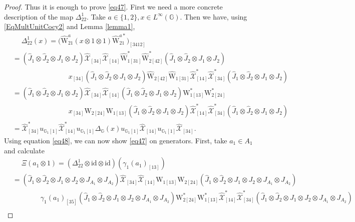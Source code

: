\documentclass[reqno]{amsart}
\numberwithin{equation}{section}
\newcommand{\id}{\mathrm{id}}
\newcommand{\G}{\mathbb{G}}
\newcommand{\mc}{\mathcal}
\newcommand{\wh}{\widehat}
\newcommand{\ww}{\mathrm{W}}
\begin{document}
\begin{proof}
Thus it is enough to prove \eqref{eq47}. First we need a more concrete description of the map $\Delta_{22}^1$. Take $a\in\{1,2\}, x\in L^{\infty}(\G)$. Then we have, using \eqref{EqMultUnitCocy2} and Lemma \ref{lemma1},
\begin{equation}\begin{split}\label{eq48}
&\quad\;
\Delta^1_{22}(x)=\bigl(
\hat{\ww}^a_{21} (x\otimes 1\otimes 1) \hat{\ww}^{a *}_{21}
 \bigr)_{[3412]}\\
 &=
 (\hat{J}_1\otimes \hat{J}_2\otimes J_1\otimes J_2)
 \wh{\mc{X}}_{[34]}\wh{\mc{X}}_{[14]}
\hat{\ww}^*_{1[31]}
\hat{\ww}^*_{2[42]}
(\hat{J}_1\otimes \hat{J}_2\otimes J_1\otimes J_2)\\
&\quad\quad\quad\quad 
\quad\quad\quad\quad 
x_{[34]}
(\hat{J}_1\otimes \hat{J}_2\otimes J_1\otimes J_2)
\hat{\ww}_{2[42]}
\hat{\ww}_{1[31]}
\wh{\mc{X}}_{[14]}^*
 \wh{\mc{X}}_{[34]}^*
 (\hat{J}_1\otimes \hat{J}_2\otimes J_1\otimes J_2)\\
 &=
  (\hat{J}_1\otimes \hat{J}_2\otimes J_1\otimes J_2)
 \wh{\mc{X}}_{[34]}\wh{\mc{X}}_{[14]}
(\hat{J}_1\otimes \hat{J}_2\otimes J_1\otimes J_2)
\ww_{1[13]}^*
\ww_{2[24]}^*
\\
&\quad\quad\quad\quad 
\quad\quad\quad\quad 
x_{[34]}
\ww_{2[24]}
\ww_{1[13]}
(\hat{J}_1\otimes \hat{J}_2\otimes J_1\otimes J_2)
\wh{\mc{X}}_{[14]}^*
 \wh{\mc{X}}_{[34]}^*
 (\hat{J}_1\otimes \hat{J}_2\otimes J_1\otimes J_2)\\
 &=
 \wh{\mc{X}}_{[34]}^*
 u_{\G_1 [1]} \wh{\mc{X}}_{[14]}^* u_{\G_1 [1]}
\Delta_{\G}(x)
u_{\G_1 [1]}
\wh{\mc{X}}_{[14]}
u_{\G_1 [1]}
 \wh{\mc{X}}_{[34]}.
\end{split}\end{equation}
Using equation \eqref{eq48}, we can now show \eqref{eq47} on generators. First, take $a_1\in A_1$ and calculate
\[\begin{split}
&\quad\;
\Xi(a_1\otimes 1)=
(\Delta^1_{22}\otimes \id\otimes \id)( \gamma_1(a_1)_{[13]})\\
&=
 (\hat{J}_1\otimes \hat{J}_2\otimes J_1\otimes J_2\otimes J_{A_1}\otimes J_{A_2})
 \wh{\mc{X}}_{[34]}\wh{\mc{X}}_{[14]}
\ww_{1[13]}
\ww_{2[24]}
(\hat{J}_1\otimes \hat{J}_2\otimes J_1\otimes J_2
\otimes J_{A_1}\otimes J_{A_2})\\
&\quad\quad\quad\quad 
\gamma_1(a_1)_{[35]}(\hat{J}_1\otimes \hat{J}_2\otimes J_1\otimes J_2
\otimes J_{A_1}\otimes J_{A_2})
\ww^*_{2[24]}
\ww^*_{1[13]}
\wh{\mc{X}}_{[14]}^*
 \wh{\mc{X}}_{[34]}^*
 (\hat{J}_1\otimes \hat{J}_2\otimes J_1\otimes J_2
 \otimes J_{A_1}\otimes J_{A_2})\\

\end{split}\]
\end{proof}
\end{document}

